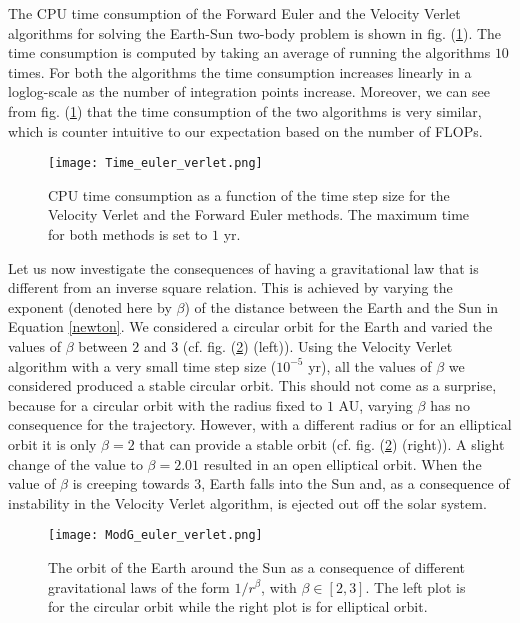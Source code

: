 \documentclass[a4paper]{article}
\begin{document}
The CPU time consumption of the Forward Euler and the Velocity Verlet algorithms for solving the Earth-Sun two-body problem is shown in fig. (\ref{Time_euler_verlet}). The time consumption is computed by taking an average of running the algorithms $10$ times. For both the algorithms the time consumption increases linearly in a loglog-scale as the number of integration points increase. Moreover, we can see from fig. (\ref{Time_euler_verlet}) that the time consumption of the two algorithms is very similar, which is counter intuitive to our expectation based on the number of FLOPs.

\begin{figure}
  \centering
  \texttt{[image: Time\_euler\_verlet.png]}
  \caption{CPU time consumption as a function of the time step size for the Velocity Verlet and the Forward Euler methods. The maximum time for both methods is set to $1$ yr.}
   \label{Time_euler_verlet}
\end{figure}

Let us now investigate the consequences of having a gravitational law that is different from an inverse square relation. This is achieved by varying the exponent (denoted here by $\beta$) of the distance between the Earth and the Sun in Equation \ref{newton}. We considered a circular orbit for the Earth and varied the values of $\beta$ between $2$ and $3$ (cf. fig. (\ref{ModG_euler_verlet}) (left)). Using the Velocity Verlet algorithm with a very small time step size ($10^{-5}$ yr), all the values of $\beta$ we considered produced a stable circular orbit. This should not come as a surprise, because for a circular orbit with the radius fixed to $1$ AU, varying ${\beta}$ has no consequence for the trajectory. However, with a different radius or for an elliptical orbit it is only $\beta=2$ that can provide a stable orbit (cf. fig. (\ref{ModG_euler_verlet}) (right)). A slight change of the value to $\beta = 2.01$ resulted in an open elliptical orbit. When the value of $\beta$ is creeping towards $3$, Earth falls into the Sun and, as a consequence of instability in the Velocity Verlet algorithm, is ejected out off the solar system. 

\begin{figure}[H]
  \centering
  \texttt{[image: ModG\_euler\_verlet.png]}
  \caption{The orbit of the Earth around the Sun as a consequence of different gravitational laws of the form $1/r^{\beta}$, with $\beta \in [2,3]$. The left plot is for the circular orbit while the right plot is for elliptical orbit.}
   \label{ModG_euler_verlet}
\end{figure}
\end{document}
